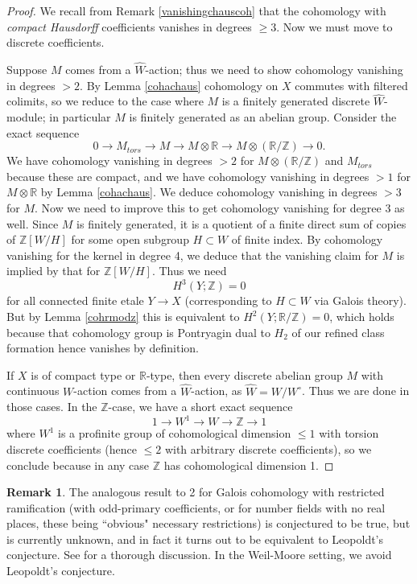 \documentclass[12pt]{article}
\theoremstyle{definition}
\newtheorem{remark}[theorem]{Remark}
\newcommand{\mbb}{\mathbb}
\newcommand{\wh}{\widehat}
\begin{document}
\begin{proof}
We recall from Remark \ref{vanishingchauscoh} that the cohomology with \emph{compact Hausdorff} coefficients vanishes in degrees $\geq 3$.  Now we must move to discrete coefficients.

Suppose $M$ comes from a $\wh{W}$-action; thus we need to show cohomology vanishing in degrees $>2$.  By Lemma \ref{cohachaus} cohomology on $X$ commutes with filtered colimits, so we reduce to the case where $M$ is a finitely generated discrete $\wh{W}$-module; in particular $M$ is finitely generated as an abelian group.  Consider the exact sequence
$$0 \to M_{tors} \to M \to M\otimes\mbb{R} \to M\otimes(\mbb{R}/\mbb{Z}) \to 0.$$
We have cohomology vanishing in degrees $>2$ for $M\otimes(\mbb{R}/\mbb{Z})$ and $M_{tors}$ because these are compact, and we have cohomology vanishing in degrees $>1$ for $M\otimes\mbb{R}$ by Lemma \ref{cohachaus}.  We deduce cohomology vanishing in degrees $>3$ for $M$.  Now we need to improve this to get cohomology vanishing for degree $3$ as well.  Since $M$ is finitely generated, it is a quotient of a finite direct sum of copies of $\mbb{Z}[W/H]$ for some open subgroup $H\subset W$ of finite index.  By cohomology vanishing for the kernel in degree 4, we deduce that the vanishing claim for $M$ is implied by that for $\mbb{Z}[W/H]$.  Thus we need
$$H^3(Y;\mbb{Z})=0$$
for all connected finite etale $Y\to X$ (corresponding to $H\subset W$ via Galois theory).  But by Lemma \ref{cohrmodz} this is equivalent to $H^2(Y;\mbb{R}/\mbb{Z})=0$, which holds because that cohomology group is Pontryagin dual to $H_2$ of our refined class formation hence vanishes by definition. 

If $X$ is of compact type or $\mbb{R}$-type, then every discrete abelian group $M$ with continuous $W$-action comes from a $\wh{W}$-action, as $\wh{W}=W/W^\circ$.  Thus we are done in those cases.  In the $\mbb{Z}$-case, we have a short exact sequence
$$1 \to W^1 \to W \to \mbb{Z} \to 1$$
where $W^1$ is a profinite group of cohomological dimension $\leq 1$ with torsion discrete coefficients (hence $\leq 2$ with arbitrary discrete coefficients), so we conclude because in any case $\mbb{Z}$ has cohomological dimension 1.
\end{proof}

\begin{remark}\label{leopoldt}
The analogous result to 2 for Galois cohomology with restricted ramification (with odd-primary coefficients, or for number fields with no real places, these being ``obvious" necessary restrictions)  is conjectured to be true, but is currently unknown, and in fact it turns out to be equivalent to Leopoldt's conjecture.  See \cite{nsw} for a thorough discussion.  In the Weil-Moore setting, we avoid Leopoldt's conjecture.
\end{remark}
\end{document}
